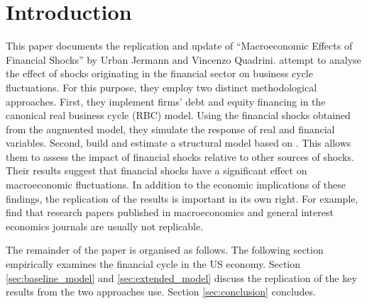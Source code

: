 \section{Introduction}
\label{sec:introduction}

This paper documents the replication and update of “Macroeconomic Effects of Financial Shocks” by Urban Jermann and Vincenzo Quadrini. \citeauthor{JERMANNfinancial} attempt to analyse the effect of shocks originating in the financial sector on business cycle fluctuations. For this purpose, they employ two distinct methodological approaches. First, they implement firms' debt and equity financing in the canonical real business cycle (RBC) model. Using the financial shocks obtained from the augmented model, they simulate the response of real and financial variables. Second, \citeauthor{JERMANNfinancial} build and estimate a structural model based on \citet{SMETSshocks}. This allows them to assess the impact of financial shocks relative to other sources of shocks. Their results suggest that financial shocks have a significant effect on macroeconomic fluctuations. In addition to the economic implications of these findings, the replication of the results is important in its own right. For example, \cite{CHANGeconomics} find that research papers published in macroeconomics and general interest economics journals are usually not replicable. 

The remainder of the paper is organised as follows. The following section empirically examines the financial cycle in the US economy. Section \ref{sec:baseline_model} and \ref{sec:extended_model} discuss the replication of the key results from the two approaches \citeauthor{JERMANNfinancial} use. Section \ref{sec:conclusion} concludes.
